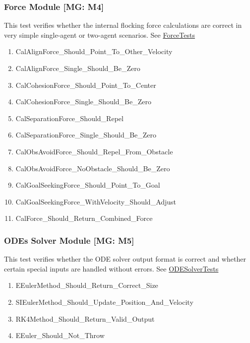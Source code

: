 \documentclass[12pt, titlepage]{article}
\begin{document}
\subsubsection{Force Module [MG: M4]} \label{UTForce}

This test verifies whether the internal flocking force calculations are 
correct in very simple single-agent or two-agent scenarios.
See \href{https://github.com/Mei0725/FlockingSimulator/blob/main/src/Assets/Tests/FlockingCalculator/ForceTests.cs}{ForceTests}
\begin{enumerate}
  \item CalAlignForce\_Should\_Point\_To\_Other\_Velocity
  \item CalAlignForce\_Single\_Should\_Be\_Zero
  \item CalCohesionForce\_Should\_Point\_To\_Center
  \item CalCohesionForce\_Single\_Should\_Be\_Zero
  \item CalSeparationForce\_Should\_Repel
  \item CalSeparationForce\_Single\_Should\_Be\_Zero
  \item CalObsAvoidForce\_Should\_Repel\_From\_Obstacle
  \item CalObsAvoidForce\_NoObstacle\_Should\_Be\_Zero
  \item CalGoalSeekingForce\_Should\_Point\_To\_Goal
  \item CalGoalSeekingForce\_WithVelocity\_Should\_Adjust
  \item CalForce\_Should\_Return\_Combined\_Force
\end{enumerate}

\subsubsection{ODEs Solver Module [MG: M5]} \label{UTSolver}

This test verifies whether the ODE solver output format is correct and whether 
certain special inputs are handled without errors.
See \href{https://github.com/Mei0725/FlockingSimulator/blob/main/src/Assets/Tests/FlockingCalculator/ODESolverTests.cs}{ODESolverTests}
\begin{enumerate}
  \item EEulerMethod\_Should\_Return\_Correct\_Size
  \item SIEulerMethod\_Should\_Update\_Position\_And\_Velocity
  \item RK4Method\_Should\_Return\_Valid\_Output
  \item EEuler\_Should\_Not\_Throw
\end{enumerate}
\end{document}
